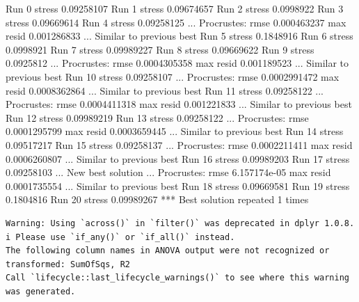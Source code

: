 \documentclass[
]{book}
\newenvironment{Shaded}{\begin{snugshade}}{\end{snugshade}}
\newcommand{\NormalTok}[1]{#1}
\begin{document}
\begin{Shaded}
\begin{Highlighting}[]
\NormalTok{Run 0 stress 0.09258107 }
\NormalTok{Run 1 stress 0.09674657 }
\NormalTok{Run 2 stress 0.0998922 }
\NormalTok{Run 3 stress 0.09669614 }
\NormalTok{Run 4 stress 0.09258125 }
\NormalTok{... Procrustes: rmse 0.000463237  max resid 0.001286833 }
\NormalTok{... Similar to previous best}
\NormalTok{Run 5 stress 0.1848916 }
\NormalTok{Run 6 stress 0.0998921 }
\NormalTok{Run 7 stress 0.09989227 }
\NormalTok{Run 8 stress 0.09669622 }
\NormalTok{Run 9 stress 0.0925812 }
\NormalTok{... Procrustes: rmse 0.0004305358  max resid 0.001189523 }
\NormalTok{... Similar to previous best}
\NormalTok{Run 10 stress 0.09258107 }
\NormalTok{... Procrustes: rmse 0.0002991472  max resid 0.0008362864 }
\NormalTok{... Similar to previous best}
\NormalTok{Run 11 stress 0.09258122 }
\NormalTok{... Procrustes: rmse 0.0004411318  max resid 0.001221833 }
\NormalTok{... Similar to previous best}
\NormalTok{Run 12 stress 0.09989219 }
\NormalTok{Run 13 stress 0.09258122 }
\NormalTok{... Procrustes: rmse 0.0001295799  max resid 0.0003659445 }
\NormalTok{... Similar to previous best}
\NormalTok{Run 14 stress 0.09517217 }
\NormalTok{Run 15 stress 0.09258137 }
\NormalTok{... Procrustes: rmse 0.0002211411  max resid 0.0006260807 }
\NormalTok{... Similar to previous best}
\NormalTok{Run 16 stress 0.09989203 }
\NormalTok{Run 17 stress 0.09258103 }
\NormalTok{... New best solution}
\NormalTok{... Procrustes: rmse 6.157174e{-}05  max resid 0.0001735554 }
\NormalTok{... Similar to previous best}
\NormalTok{Run 18 stress 0.09669581 }
\NormalTok{Run 19 stress 0.1804816 }
\NormalTok{Run 20 stress 0.09989267 }
\NormalTok{*** Best solution repeated 1 times}
\end{Highlighting}
\end{Shaded}

\begin{verbatim}
Warning: Using `across()` in `filter()` was deprecated in dplyr 1.0.8.
i Please use `if_any()` or `if_all()` instead.
The following column names in ANOVA output were not recognized or transformed: SumOfSqs, R2
Call `lifecycle::last_lifecycle_warnings()` to see where this warning was generated.
\end{verbatim}
\end{document}
